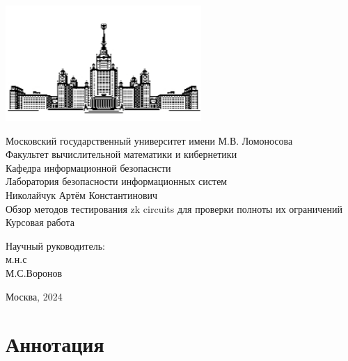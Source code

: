 \documentclass[a4paper]{article}
\begin{document}
 
\begin{center}
\includegraphics{MSU}

\hfill \break
\normalsize{Московский государственный университет имени М.В. Ломоносова}\\
\normalsize{Факультет вычислительной математики и кибернетики}\\
\normalsize{Кафедра информационной безопаснсти}\\
\normalsize{Лаборатория безопасности информационных систем}\\
 \hfill \break
\normalsize{Николайчук Артём Константинович}\\
\hfill\break
\hfill \break
\hfill \break
\hfill \break
\large{Обзор методов тестирования zk circuits для проверки полноты их ограничений}\\
\hfill \break
\hfill \break
\hfill \break
\normalsize{Курсовая работа}\\
\hfill \break
\hfill \break
\hfill \break
\hfill \break
\hfill \break
\hfill \break
\hfill \break
\hfill \break
\begin{flushright}
    \normalsize{Научный руководитель:}\\
    \normalsize{м.н.с}\\
    \normalsize{М.С.Воронов}\\
\end{flushright}
\end{center}
\vspace*{\fill}
\begin{center} Москва, 2024 \end{center}
\thispagestyle{empty}
 
\newpage
\section*{Аннотация}
\indent
\end{document}

